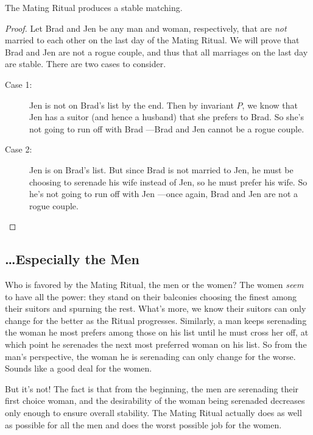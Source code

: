 \begin{theorem}
The Mating Ritual produces a stable matching.
\end{theorem}

\begin{proof}
Let Brad and Jen be any man and woman, respectively, that are
\emph{not} married to each other on the last day of the Mating Ritual.
We will prove that Brad and Jen are not a rogue couple, and thus that
all marriages on the last day are stable.  There are two cases to consider.
\begin{description}

\item[Case 1:] Jen is not on Brad's list by the end.  Then by invariant
  $P$, we know that Jen has a suitor (and hence a husband) that she
  prefers to Brad.  So she's not going to run off with Brad ---Brad and
  Jen cannot be a rogue couple.

\item[Case 2:] Jen is on Brad's list.  But since Brad is not married to
  Jen, he must be choosing to serenade his wife instead of Jen, so he
  must prefer his wife.  So he's not going to run off with Jen ---once
  again, Brad and Jen are not a rogue couple.
 \qedhere

\end{description}

\end{proof}


\subsection{\dots Especially the Men}

Who is favored by the Mating Ritual, the men or the women?  The women
\emph{seem} to have all the power: they stand on their balconies
choosing the finest among their suitors and spurning the rest.  What's
more, we know their suitors can only change for the better as the
Ritual progresses.  Similarly, a man keeps serenading the woman he
most prefers among those on his list until he must cross her off, at
which point he serenades the next most preferred woman on his list.  So
from the man's perspective, the woman he is serenading can only change
for the worse.  Sounds like a good deal for the women.

But it's not!  The fact is that from the beginning, the men are
serenading their first choice woman, and the desirability of the woman
being serenaded decreases only enough to ensure overall stability.
The Mating Ritual actually does as well as possible for all the men
and does the worst possible job for the women.


